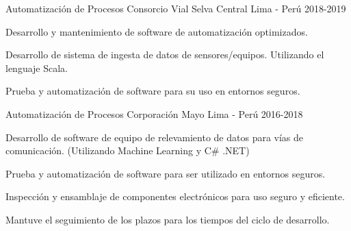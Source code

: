 \begin{cventries}
  \cventry
  {Automatizaci\'on de Procesos} %
  {Consorcio Vial Selva Central} %
  {Lima - Per\'u} %
  {2018-2019} %
  {
    \begin{cvitems} %
      \item {Desarrollo y mantenimiento de software de automatizaci\'on optimizados.}
      \item {Desarrollo de sistema de ingesta de datos de sensores/equipos. Utilizando el lenguaje Scala.}
      \item {Prueba y automatizaci\'on de software para su uso en entornos seguros.}
    \end{cvitems}
  }

  \cventry
  {Automatizaci\'on de Procesos} %
  {Corporaci\'on Mayo} %
  {Lima - Per\'u} %
  {2016-2018} %
  {
    \begin{cvitems} %
      \item {Desarrollo de software de equipo de relevamiento de datos para v\'ias de comunicaci\'on. (Utilizando Machine Learning y C\# .NET)}
      \item {Prueba y automatizaci\'on de software para ser utilizado en entornos seguros.}
      \item {Inspecci\'on y ensamblaje de componentes electr\'onicos para uso seguro y eficiente.}
      \item {Mantuve el seguimiento de los plazos para los tiempos del ciclo de desarrollo.}
    \end{cvitems}
  }

\end{cventries}

